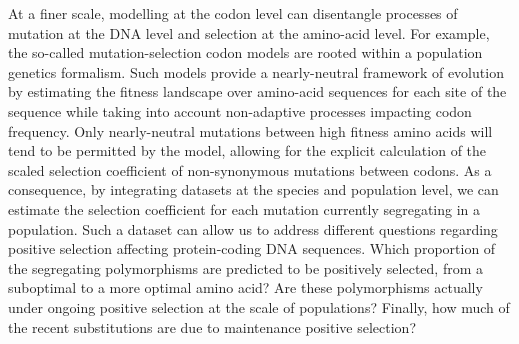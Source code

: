 \documentclass{article}
\begin{document}
    At a finer scale, modelling at the codon level can disentangle processes of mutation at the DNA level and selection at the amino-acid level.
    For example, the so-called mutation-selection codon models are rooted within a population genetics formalism\cite{halpern_evolutionary_1998, mccandlish_modeling_2014}.
    Such models provide a nearly-neutral framework of evolution by estimating the fitness landscape over amino-acid sequences for each site of the sequence while taking into account non-adaptive processes impacting codon frequency\cite{halpern_evolutionary_1998, rodrigue_mechanistic_2010, tamuri_estimating_2012}.
    Only nearly-neutral mutations between high fitness amino acids will tend to be permitted by the model, allowing for the explicit calculation of the scaled selection coefficient of non-synonymous mutations between codons.
    As a consequence, by integrating datasets at the species and population level, we can estimate the selection coefficient for each mutation currently segregating in a population.
    Such a dataset can allow us to address different questions regarding positive selection affecting protein-coding DNA sequences.
    Which proportion of the segregating polymorphisms are predicted to be positively selected, from a suboptimal to a more optimal amino acid?
    Are these polymorphisms actually under ongoing positive selection at the scale of populations?
    Finally, how much of the recent substitutions are due to maintenance positive selection?
\end{document}
